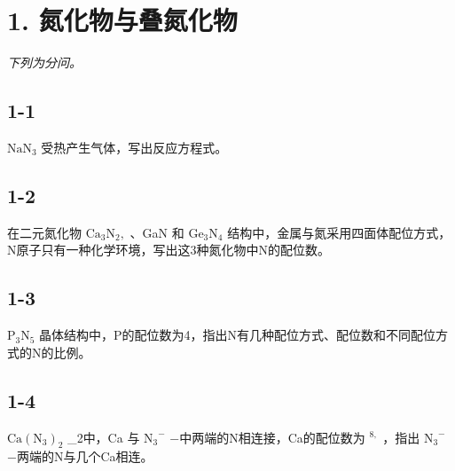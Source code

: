 \section*{1. 氮化物与叠氮化物}
\textit{下列为分问。}

\subsection*{1-1}
$\mathrm { N a N _ { 3 } }$ 受热产⽣⽓体，写出反应⽅程式。

\subsection*{1-2}
在⼆元氮化物 $\mathrm { C a _ { 3 } N _ { 2 } } ,$ 、GaN 和 $\mathrm { G e _ { 3 } N _ { 4 } }$ 结构中，⾦属与氮采⽤四⾯体配位⽅式，N原⼦只有⼀种化学环境，写出这3种氮化物中N的配位数。

\subsection*{1-3}
$\mathrm { P _ { 3 } N _ { 5 } }$ 晶体结构中，P的配位数为4，指出N有⼏种配位⽅式、配位数和不同配位⽅式的N的⽐例。

\subsection*{1-4}
$\mathrm { C a } ( \mathrm { N } _ { 3 } ) _ { 2 }$ _{2}中，Ca 与 $\mathrm { N _ { 3 } } ^ { - }$ −中两端的N相连接，Ca的配位数为 $^ { 8 , }$ ，指出 $\mathrm { N _ { 3 } } ^ { - }$ −两端的N与⼏个Ca相连。

